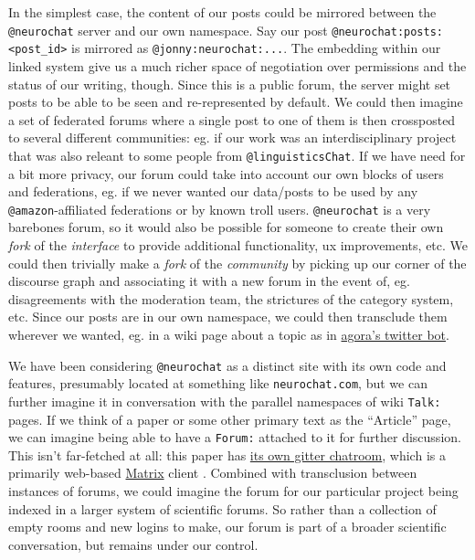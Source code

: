 \documentclass[10pt]{tufte-book}
\begin{document}
In the simplest case, the content of our posts could be mirrored between
the \texttt{@neurochat} server and our own namespace. Say our post
\texttt{@neurochat:posts:\textless{}post\_id\textgreater{}} is mirrored
as \texttt{@jonny:neurochat:...}. The embedding within our linked system
give us a much richer space of negotiation over permissions and the
status of our writing, though. Since this is a public forum, the server
might set posts to be able to be seen and re-represented by default. We
could then imagine a set of federated forums where a single post to one
of them is then crossposted to several different communities: eg. if our
work was an interdisciplinary project that was also releant to some
people from \texttt{@linguisticsChat}. If we have need for a bit more
privacy, our forum could take into account our own blocks of users and
federations, eg. if we never wanted our data/posts to be used by any
\texttt{@amazon}-affiliated federations or by known troll users.
\texttt{@neurochat} is a very barebones forum, so it would also be
possible for someone to create their own \emph{fork} of the
\emph{interface} to provide additional functionality, ux improvements,
etc. We could then trivially make a \emph{fork} of the \emph{community}
by picking up our corner of the discourse graph and associating it with
a new forum in the event of, eg. disagreements with the moderation team,
the strictures of the category system, etc. Since our posts are in our
own namespace, we could then transclude them wherever we wanted, eg. in
a wiki page about a topic as in
\href{https://anagora.org/node/agora-bot}{agora's twitter bot}.

We have been considering \texttt{@neurochat} as a distinct site with its
own code and features, presumably located at something like
\texttt{neurochat.com}, but we can further imagine it in conversation
with the parallel namespaces of wiki \texttt{Talk:} pages. If we think
of a paper or some other primary text as the ``Article'' page, we can
imagine being able to have a \texttt{Forum:} attached to it for further
discussion. This isn't far-fetched at all: this paper has
\href{https://gitter.im/scientific-infrastructure/community}{its own
gitter chatroom}, which is a primarily web-based
\href{https://matrix.org/}{Matrix} client \citep{hodgsonGitterNowSpeaks2020, hodgsonWelcomingGitterMatrix2020} .
Combined with transclusion between instances of forums, we could imagine
the forum for our particular project being indexed in a larger system of
scientific forums. So rather than a collection of empty rooms and new
logins to make, our forum is part of a broader scientific conversation,
but remains under our control.
\end{document}
